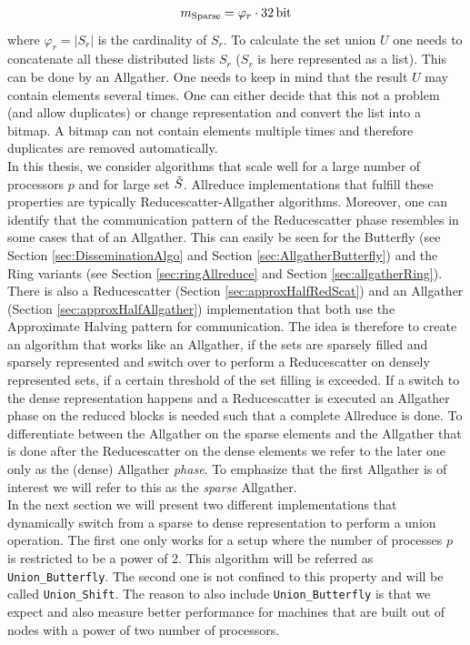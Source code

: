\begin{align*}
	m_\mathrm{Sparse} = \varphi_r \cdot \qty{32}{\bit}
\end{align*}
where $\varphi_r = |S_r|$ is the cardinality of $S_r$. To calculate the set union $U$ one needs to concatenate all these distributed lists $S_r$ ($S_r$ is here represented as a list). This can be done by an Allgather. One needs to keep in mind that the result $U$ may contain elements several times. One can either decide that this not a problem (and allow duplicates) or change representation and convert the list into a bitmap. A bitmap can not contain elements multiple times and therefore duplicates are removed automatically. \\
In this thesis, we consider algorithms that scale well for a large number of processors $p$ and for large set $\Tilde{S}$. Allreduce implementations that fulfill these properties are typically Reducescatter-Allgather algorithms. Moreover, one can identify that the communication pattern of the Reducescatter phase resembles in some cases that of an Allgather. This can easily be seen for the Butterfly (see Section \ref{sec:DisseminationAlgo} and Section \ref{sec:AllgatherButterfly}) and the Ring variants (see Section \ref{sec:ringAllreduce} and Section \ref{sec:allgatherRing}). There is also a Reducescatter (Section \ref{sec:approxHalfRedScat}) and an Allgather (Section \ref{sec:approxHalfAllgather}) implementation that both use the Approximate Halving pattern for communication. The idea is therefore to create an algorithm that works like an Allgather, if the sets are sparsely filled and sparsely represented and switch over to perform a Reducescatter on densely represented sets, if a certain threshold of the set filling is exceeded. If a switch to the dense representation happens and a Reducescatter is executed an Allgather phase on the reduced blocks is needed such that a complete Allreduce is done. To differentiate between the Allgather on the sparse elements and the Allgather that is done after the Reducescatter on the dense elements we refer to the later one only as the (dense) Allgather \emph{phase}. To emphasize that the first Allgather is of interest we will  refer to this as the \emph{sparse} Allgather.\\
In the next section we will present two different implementations that dynamically switch from a sparse to dense representation to perform a union operation. The first one only works for a setup where the number of processes $p$ is restricted to be a power of 2. This algorithm will be referred as \texttt{Union\_Butterfly}. The second one is not confined to this property and will be called \texttt{Union\_Shift}. The reason to also include \texttt{Union\_Butterfly} is that we expect and also measure better performance for machines that are built out of nodes with a power of two number of processors.

